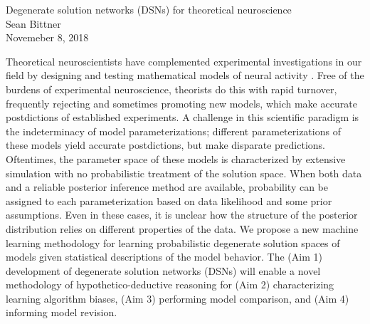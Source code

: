 \documentclass[11pt]{article}
\begin{document}
\medskip                        %

\thispagestyle{plain}
\begin{center}                  %
{\Large Degenerate solution networks (DSNs) for theoretical neuroscience} \\
Sean Bittner \\
Novemeber 8, 2018 \\
\end{center}

Theoretical neuroscientists have complemented experimental investigations in our field by designing and testing mathematical models of neural activity \cite{abbott2008theoretical}. Free of the burdens of experimental neuroscience, theorists do this with rapid turnover, frequently rejecting and sometimes promoting new models, which make accurate postdictions of established experiments.  A challenge in this scientific paradigm is the indeterminacy of model parameterizations; different parameterizations of these models yield accurate postdictions, but make disparate predictions.  Oftentimes, the parameter space of these models is characterized by extensive simulation with no probabilistic treatment of the solution space.  When both data and a reliable posterior inference method are available, probability can be assigned to each parameterization based on data likelihood and some prior assumptions.  Even in these cases, it is unclear how the structure of the posterior distribution relies on different properties of the data.  We propose a new machine learning methodology for learning probabilistic degenerate solution spaces of models given statistical descriptions of the model behavior.  The (Aim 1) development of degenerate solution networks (DSNs) will enable a novel methodology of hypothetico-deductive reasoning for (Aim 2) characterizing learning algorithm biases, (Aim 3) performing model comparison, and (Aim 4) informing model revision.
\end{document}
